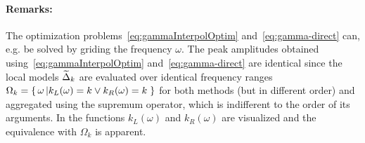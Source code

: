 \vspace{-2em}
\paragraph*{Remarks:}
The optimization problems~\eqref{eq:gammaInterpolOptim} and~\eqref{eq:gamma-direct} can, e.g. be solved by griding the frequency $\omega$.
The peak amplitudes obtained using~\eqref{eq:gammaInterpolOptim} and~\eqref{eq:gamma-direct} are identical since the local models $\widetilde{\Delta}_k$ are evaluated over identical frequency ranges
$%
  \Omega_k = \set{\omega \given{k_L(\omega) = k \vee k_R(\omega) = k}}
$ %
for both methods (but in different order) and aggregated using the supremum operator, which is indifferent to the order of its arguments.
In  the functions $k_L(\omega)$ and $k_R(\omega)$ are visualized and the equivalence with $\Omega_k$ is apparent.

